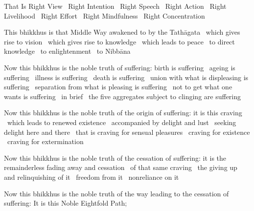 \begin{english-only-hang}
  That Is Right View \breathmark\ Right Intention \breathmark\ Right Speech \breathmark\ Right Action \breathmark\ Right Livelihood \breathmark\ Right Effort \breathmark\ Right Mindfulness \breathmark\ Right Concentration
\end{english-only-hang}

\begin{english-only-hang}
  This bhikkhus is that Middle Way awakened to by the Tathāgata \breathmark\ which gives rise to vision \breathmark\ which gives rise to knowledge \breathmark\ which leads to peace \breathmark\ to direct knowledge \breathmark\ to enlightenment \breathmark\ to Nibbāna
\end{english-only-hang}

\begin{english-only-hang}
  Now this bhikkhus is the noble truth of suffering: birth is suffering \breathmark\ ageing is suffering \breathmark\ illness is suffering \breathmark\ death is suffering \breathmark\ union with what is displeasing is suffering \breathmark\ separation from what is pleasing is suffering \breathmark\ not to get what one wants is suffering \breathmark\ in brief \breathmark\ the five aggregates subject to clinging are suffering
\end{english-only-hang}

\begin{english-only-hang}
  Now this bhikkhus is the noble truth of the origin of suffering: it is this craving \breathmark\ which leads to renewed existence \breathmark\ accompanied by delight and lust \breathmark\ seeking delight here and there \breathmark\ that is craving for sensual pleasures \breathmark\ craving for existence \breathmark\ craving for extermination
\end{english-only-hang}

\begin{english-only-hang}
  Now this bhikkhus is the noble truth of the cessation of suffering: it is the remainderless fading away and cessation \breathmark\ of that same craving \breathmark\ the giving up and relinquishing of it \breathmark\ freedom from it \breathmark\ nonreliance on it
\end{english-only-hang}

\begin{english-only-hang}
  Now this bhikkhus is the noble truth of the way leading to the cessation of suffering: It is this Noble Eightfold Path;
\end{english-only-hang}

